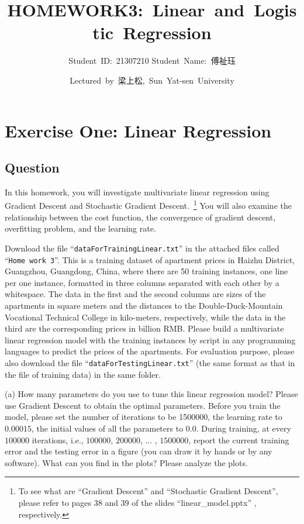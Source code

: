 \documentclass[a4paper, utf8]{ctexart}
\title{\songti \Large \textbf{HOMEWORK3:\ Linear\ and\ Logistic\ Regression}}
\author{Student\ ID:\ 21307210 \qquad Student\ Name:\ 傅祉珏}
\date{Lectured\ by\ 梁上松,\ Sun\ Yat-sen\ University}
\begin{document}
	
	\maketitle
	
	\section{Exercise One: Linear Regression}
	
	\subsection{Question}
	
	In this homework, you will investigate multivariate linear regression using Gradient Descent  and Stochastic Gradient Descent.~\footnote{To see what are ``Gradient Descent'' and ``Stochastic Gradient Descent'', please refer to pages 38 and 39 of the slides ``linear\_model.pptx'' , respectively.} You will also examine the relationship between the cost function, the convergence of gradient descent, overfitting problem, and the learning rate.
	
	Download the file ``\verb|dataForTrainingLinear.txt|'' in the attached files called ``\verb|Home|\ \verb|work 3|''. This is a training dataset of apartment prices in Haizhu District, Guangzhou, Guangdong, China, where there are 50 training instances, one line per one instance, formatted in three columns separated with each other by a whitespace. The data in the first and the second columns are sizes of the apartments in square meters and the distances to the Double-Duck-Mountain Vocational Technical College in kilo-meters, respectively, while the data in the third are the corresponding prices in billion RMB. Please build a multivariate linear regression model with the training instances by script in any programming languages to predict the prices of the apartments. For evaluation purpose, please also download the file ``\verb|dataForTestingLinear.txt|'' (the same format as that in the file of training data) in the same folder.
	
	\vspace{.5em}
	
	(a) How many parameters do you use to tune this linear regression model? Please use Gradient Descent to obtain the optimal parameters. Before you train the model, please set the number of iterations to be 1500000, the learning rate to $0.00015$, the initial values of all the parameters to $0.0$. During training, at every $100000$ iterations, i.e., $100000$, $200000$, ... , $1500000$, report the current training error and the testing error in a figure (you can draw it by hands or by any software). What can you find in the plots? Please analyze the plots.
	
\end{document}
